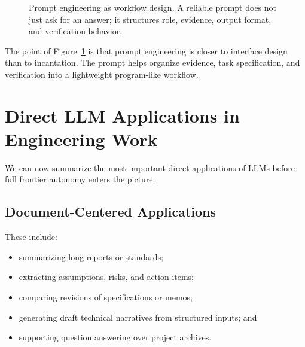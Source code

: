 \documentclass[12pt]{article}
\begin{document}
\begin{figure}[ht]
    \centering
    \caption{Prompt engineering as workflow design. A reliable prompt does not just ask for an answer; it structures role, evidence, output format, and verification behavior.}
    \label{t16fig:prompt_workflow}
\end{figure}

The point of Figure~\ref{t16fig:prompt_workflow} is that prompt engineering is closer to interface design than to incantation. The prompt helps organize evidence, task specification, and verification into a lightweight program-like workflow.

\section{Direct LLM Applications in Engineering Work}

We can now summarize the most important direct applications of LLMs before full frontier autonomy enters the picture.

\subsection{Document-Centered Applications}

These include:
\begin{itemize}
    \item summarizing long reports or standards;
    \item extracting assumptions, risks, and action items;
    \item comparing revisions of specifications or memos;
    \item generating draft technical narratives from structured inputs; and
    \item supporting question answering over project archives.
\end{itemize}
\end{document}
